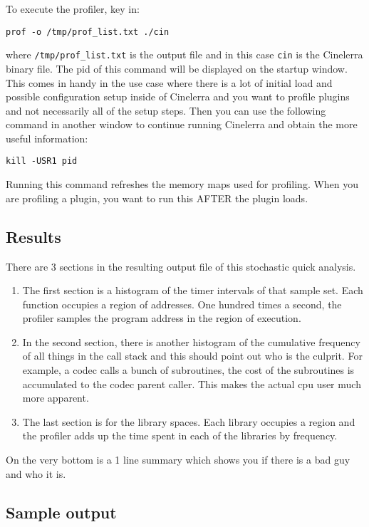 To execute the profiler, key in:

\hspace{2em}\texttt{prof -o /tmp/prof\_list.txt ./cin}

where \texttt{/tmp/prof\_list.txt} is the output file and in this case \texttt{cin} is the Cinelerra binary file. The pid of this command will be displayed on the startup window. This comes in handy in the use case where there is a lot of initial load and possible configuration setup inside of Cinelerra and you want to profile plugins and not necessarily all of the setup steps. Then you can use the following command in another window to continue running Cinelerra and obtain the more useful information:

\hspace{2em}\texttt{kill -USR1 pid}

Running this command refreshes the memory maps used for profiling. When you are profiling a plugin, you want to run this AFTER the plugin loads.

\subsection{Results}
\label{sub:results}

There are 3 sections in the resulting output file of this stochastic quick analysis.

\begin{enumerate}[nosep]
	\item The first section is a histogram of the timer intervals of that sample set. Each function occupies a region of addresses. One hundred times a second, the profiler samples the program address in the region of execution.
	\item In the second section, there is another histogram of the cumulative frequency of all things in the call stack and this should point out who is the culprit. For example, a codec calls a bunch of subroutines, the cost of the subroutines is accumulated to the codec parent caller. This makes the actual cpu user much more apparent.
	\item The last section is for the library spaces. Each library occupies a region and the profiler adds up the time spent in each of the libraries by frequency.
\end{enumerate}

On the very bottom is a 1 line summary which shows you if there is a bad guy and who it is.

\subsection{Sample output}
\label{sub:sample_output}

